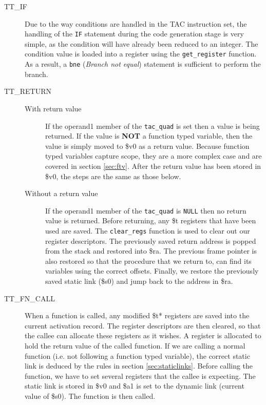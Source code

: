 \begin{description}
	\item[TT\_IF] Due to the way conditions are handled in the TAC instruction set, the handling of the \verb!IF! statement during the code generation stage is very simple, as the condition will have already been reduced to an integer. The condition value is loaded into a register using the \verb!get_register! function. As a result, a \verb!bne! (\emph{Branch not equal}) statement is sufficient to perform the branch.
	\item[TT\_RETURN]
		\begin{description}
			\item[With return value] If the operand1 member of the \verb!tac_quad! is set then a value is being returned. If the value is \textbf{NOT} a function typed variable, then the value is simply moved to \$v0 as a return value. Because function typed variables capture scope, they are a more complex case and are covered in section \ref{sec:ftv}. After the return value has been stored in \$v0, the steps are the same as those below.
			\item[Without a return value] If the operand1 member of the \verb!tac_quad! is \verb!NULL! then no return value is returned. Before returning, any \$t registers that have been used are saved. The \verb!clear_regs! function is used to clear out our register descriptors. The previously saved return address is popped from the stack and restored into \$ra. The previous frame pointer is also restored so that the procedure that we return to, can find its variables using the correct offsets. Finally, we restore the previously saved static link (\$s0) and jump back to the address in \$ra.
		\end{description}
	\item[TT\_FN\_CALL] When a function is called, any modified \$t* registers are saved into the current activation record. The register descriptors are then cleared, so that the callee can allocate these registers as it wishes. A register is allocated to hold the return value of the called function. If we are calling a normal function (i.e. not following a function typed variable), the correct static link is deduced by the rules in section \ref{sec:staticlinks}. Before calling the function, we have to set several registers that the callee is expecting. The static link is stored in \$v0 and \$a1 is set to the dynamic link (current value of \$s0). The function is then called.
	\ \\ \ \\

\end{description}
